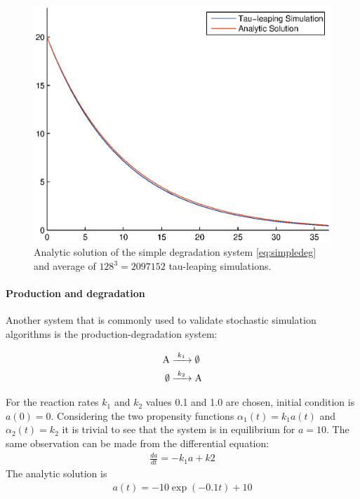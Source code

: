 \begin{figure}
\centering
\includegraphics[width=\textwidth]{images/tau_decaying_average.eps}
\caption{Analytic solution of the simple degradation system \eqref{eq:simpledeg} and average of $128^3=2097152$ tau-leaping simulations. }
\label{fig:tau_dec_average}
\end{figure}


\paragraph{Production and degradation} Another system that is commonly used to validate stochastic simulation algorithms is the production-degradation system:

\begin{align}
\label{eq:gendeg1}
\cee{A &->[k_1] \emptyset{}} \\
\label{eq:gendeg2}
\cee{\emptyset{} &->[k_2] A}
\end{align}

For the reaction rates $k_1$ and $k_2$ values 0.1 and 1.0 are chosen, initial condition is $a(0) = 0$. Considering the two propensity functions $\alpha_1(t) = k_1 a(t)$ and $\alpha_2(t) = k_2$ it is trivial to see that the system is in equilibrium for $a=10$. The same observation can be made from the differential equation:
\begin{align}
\frac{da}{dt} = -k_1a+k2
\end{align}
The analytic solution is 
\begin{align}
a(t) = -10 \exp(-0.1t)+10
\end{align}

